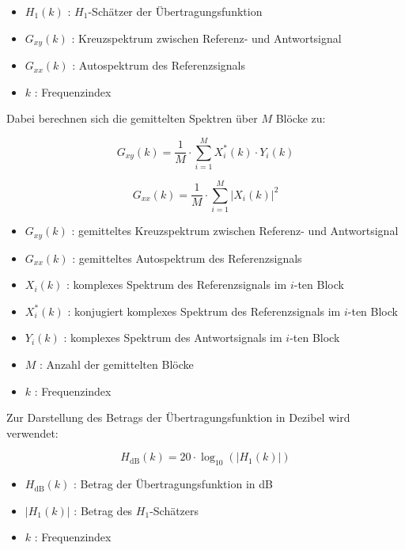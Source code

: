 \begin{itemize}
    \item $H_1(k)$ : $H_1$-Schätzer der Übertragungsfunktion
    \item $G_{xy}(k)$ : Kreuzspektrum zwischen Referenz- und Antwortsignal
    \item $G_{xx}(k)$ : Autospektrum des Referenzsignals
    \item $k$ : Frequenzindex
\end{itemize}

Dabei berechnen sich die gemittelten Spektren über $M$ Blöcke zu:

\begin{equation}
G_{xy}(k) = \frac{1}{M} \cdot \sum_{i=1}^{M} X_i^*(k) \cdot Y_i(k)
\end{equation}

\begin{equation}
G_{xx}(k) = \frac{1}{M} \cdot \sum_{i=1}^{M} |X_i(k)|^2
\end{equation}

\begin{itemize}
    \item $G_{xy}(k)$ : gemitteltes Kreuzspektrum zwischen Referenz- und Antwortsignal
    \item $G_{xx}(k)$ : gemitteltes Autospektrum des Referenzsignals
    \item $X_i(k)$ : komplexes Spektrum des Referenzsignals im $i$-ten Block
    \item $X_i^*(k)$ : konjugiert komplexes Spektrum des Referenzsignals im $i$-ten Block
    \item $Y_i(k)$ : komplexes Spektrum des Antwortsignals im $i$-ten Block
    \item $M$ : Anzahl der gemittelten Blöcke
    \item $k$ : Frequenzindex
\end{itemize}

Zur Darstellung des Betrags der Übertragungsfunktion in Dezibel wird verwendet:

\begin{equation}
H_{\mathrm{dB}}(k) = 20 \cdot \log_{10}\left(|H_1(k)|\right)
\end{equation}

\begin{itemize}
    \item $H_{\mathrm{dB}}(k)$ : Betrag der Übertragungsfunktion in dB
    \item $|H_1(k)|$ : Betrag des $H_1$-Schätzers
    \item $k$ : Frequenzindex
\end{itemize}

